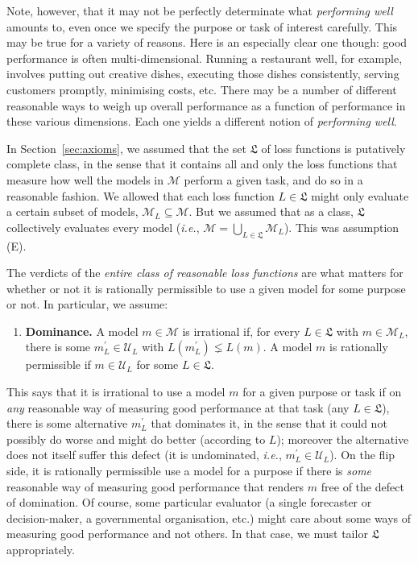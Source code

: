 \documentclass[11pt]{article}
\theoremstyle{definition}
\theoremstyle{remark}
\newcommand{\M}{\mathcal M}
\newcommand{\U}{\mathcal U}
\begin{document}
Note, however, that it may not be perfectly determinate what \textit{performing well} amounts to, even once we specify the purpose or task of interest carefully. This may be true for a variety of reasons. Here is an especially clear one though: good performance is often multi-dimensional. Running a restaurant well, for example, involves putting out creative dishes, executing those dishes consistently, serving customers promptly, minimising costs, etc. There may be a number of different reasonable ways to weigh up overall performance as a function of performance in these various dimensions. Each one yields a different notion of \textit{performing well}.

In Section~\ref{sec:axioms}, we assumed that the set $\mathfrak L$ of loss functions is putatively complete class, in the sense that it contains all and only the loss functions that measure how well the models in $\M$ perform a given task, and do so in a reasonable fashion. We allowed that each loss function $L\in\mathfrak L$ might only evaluate a certain subset of models, $\M_L\subseteq\M$. But we assumed that as a class, $\mathfrak L$ collectively evaluates every model (\textit{i.e.}, $\M=\bigcup_{L\in\mathfrak L}\M_L$). This was assumption (E).




The verdicts of the \textit{entire class of reasonable loss functions} are what matters for whether or not it is rationally permissible to use a given model for some purpose or not. In particular, we assume:


\begin{enumerate}[label=\textbf{(D)},leftmargin=*]
\item \textbf{Dominance.} A model $m\in\M$ is irrational if, for every $L\in\mathfrak L$ with $m\in\M_L$, there is some $m_L^\prime\in\U_L$ with $L(m_L^\prime)\lneq L(m)$. A model $m$ is rationally permissible if $m\in\U_L$ for some $L\in\mathfrak L$.
\end{enumerate}


This says that it is irrational to use a model $m$ for a given purpose or task if on \textit{any} reasonable way of measuring good performance at that task (any $L\in\mathfrak L$), there is some alternative $m_L^\prime$ that dominates it, in the sense that it could not possibly do worse and might do better (according to $L$); moreover the alternative does not itself suffer this defect (it is undominated, \textit{i.e.}, $m_L^\prime\in\U_L$). On the flip side, it is rationally permissible use a model for a purpose if there is \textit{some} reasonable way of measuring good performance that renders $m$ free of the defect of domination. Of course, some particular evaluator (a single forecaster or decision-maker, a governmental organisation, etc.) might care about some ways of measuring good performance and not others. In that case, we must tailor $\mathfrak L$ appropriately.
\end{document}
